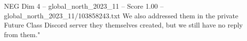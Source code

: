 \begin{textsample}{NEG Dim 4 – global\_north\_2023\_11 – Score 1.00 – global\_north\_2023\_11/103858243.txt}
We also addressed them in the private Future Class Discord server they themselves created, but we still have no reply from them."

\end{textsample}
